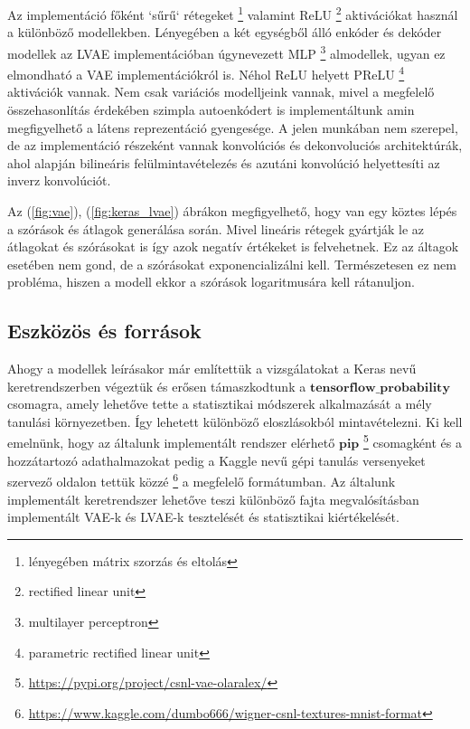 \documentclass[12pt, english]{article}
\begin{document}
\vspace{4mm}

\par Az implementáció főként `sűrű` rétegeket \footnote{lényegében mátrix szorzás és eltolás} valamint ReLU \footnote{rectified linear unit} aktivációkat használ a különböző modellekben. Lényegében a két egységből álló enkóder és dekóder modellek az LVAE implementációban úgynevezett MLP \footnote{multilayer perceptron} almodellek, ugyan ez elmondható a VAE implementációkról is. Néhol ReLU helyett PReLU \footnote{parametric rectified linear unit} aktivációk vannak. Nem csak variációs modelljeink vannak, mivel a megfelelő összehasonlítás érdekében szimpla autoenkódert is implementáltunk amin megfigyelhető a látens reprezentáció gyengesége. A jelen munkában nem szerepel, de az implementáció részeként vannak konvolúciós és dekonvoluciós architektúrák, ahol \cite{odena2016deconvolution} alapján bilineáris felülmintavételezés és azutáni konvolúció helyettesíti az inverz konvolúciót. 

\vspace{4mm}

\par Az (\ref{fig:vae}), (\ref{fig:keras_lvae}) ábrákon megfigyelhető, hogy van egy köztes lépés a szórások és átlagok generálása során. Mivel lineáris rétegek gyártják le az átlagokat és szórásokat is így azok negatív értékeket is felvehetnek. Ez az áltagok esetében nem gond, de a szórásokat exponencializálni kell. Természetesen ez nem probléma, hiszen a modell ekkor a szórások logaritmusára kell rátanuljon.

\vspace{5mm}

\subsection{Eszközös és források}

\vspace{5mm}

\par Ahogy a modellek leírásakor már említettük a vizsgálatokat a Keras nevű keretrendszerben végeztük és erősen támaszkodtunk a $\bm{tensorflow\_probability}$  csomagra, amely lehetőve tette a statisztikai módszerek alkalmazását a mély tanulási környezetben. Így lehetett különböző eloszlásokból mintavételezni. Ki kell emelnünk, hogy az általunk implementált rendszer elérhető $\bm{pip}$ \footnote{\url{https://pypi.org/project/csnl-vae-olaralex/}} csomagként és a hozzátartozó adathalmazokat pedig a Kaggle nevű gépi tanulás versenyeket szervező oldalon tettük közzé \footnote{\url{https://www.kaggle.com/dumbo666/wigner-csnl-textures-mnist-format}} a megfelelő formátumban. Az általunk implementált keretrendszer lehetőve teszi különböző fajta megvalósításban implementált VAE-k és LVAE-k tesztelését és statisztikai kiértékelését.
\end{document}
